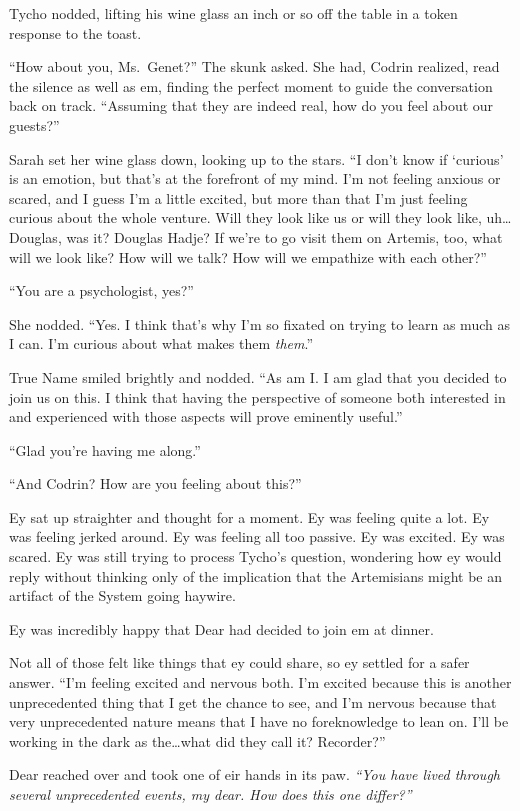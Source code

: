 Tycho nodded, lifting his wine glass an inch or so off the table in a token response to the toast.

``How about you, Ms.~Genet?'' The skunk asked. She had, Codrin realized, read the silence as well as em, finding the perfect moment to guide the conversation back on track. ``Assuming that they are indeed real, how do you feel about our guests?''

Sarah set her wine glass down, looking up to the stars. ``I don't know if `curious' is an emotion, but that's at the forefront of my mind. I'm not feeling anxious or scared, and I guess I'm a little excited, but more than that I'm just feeling curious about the whole venture. Will they look like us or will they look like, uh\ldots Douglas, was it? Douglas Hadje? If we're to go visit them on Artemis, too, what will we look like? How will we talk? How will we empathize with each other?''

``You are a psychologist, yes?''

She nodded. ``Yes. I think that's why I'm so fixated on trying to learn as much as I can. I'm curious about what makes them \emph{them}.''

True Name smiled brightly and nodded. ``As am I. I am glad that you decided to join us on this. I think that having the perspective of someone both interested in and experienced with those aspects will prove eminently useful.''

``Glad you're having me along.''

``And Codrin? How are you feeling about this?''

Ey sat up straighter and thought for a moment. Ey was feeling quite a lot. Ey was feeling jerked around. Ey was feeling all too passive. Ey was excited. Ey was scared. Ey was still trying to process Tycho's question, wondering how ey would reply without thinking only of the implication that the Artemisians might be an artifact of the System going haywire.

Ey was incredibly happy that Dear had decided to join em at dinner.

Not all of those felt like things that ey could share, so ey settled for a safer answer. ``I'm feeling excited and nervous both. I'm excited because this is another unprecedented thing that I get the chance to see, and I'm nervous because that very unprecedented nature means that I have no foreknowledge to lean on. I'll be working in the dark as the\ldots what did they call it? Recorder?''

Dear reached over and took one of eir hands in its paw. \emph{``You have lived through several unprecedented events, my dear. How does this one differ?''}

